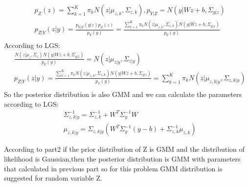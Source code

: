 \documentclass[12pt]{article}
\begin{document}
\begin{qsolve}[Question 2]
	\begin{align*}
		 & p_Z(z)=\sum_{k=1}^{K}\pi_kN(z|\mu_{z,k},\Sigma_{z,k}) ,p_{Y|Z}=N(y|Wz+b,\Sigma_{y|z})                                              \\
		 & p_{Z|Y}(z|y)=\frac{p_{Y|Z}(y|z)p_Z(z)}{p_Y(y)}=\frac{\sum_{k=1}^{K}\pi_kN(z|\mu_{z,k},\Sigma_{z,k})N(y|Wz+b,\Sigma_{y|z})}{p_Y(y)} \\
	\end{align*}
	According to LGS:
	\begin{align*}
		 & \frac{N(z|\mu_z,\Sigma_z)N(y|Wz+b,\Sigma_{y|z})}{p_Y(y)}=N(z|\mu_{z|y},\Sigma_{z|y})                                                                \\
		 & p_{Z|Y}(z|y)=\frac{\sum_{k=1}^{K}\pi_kN(z|\mu_{z,k},\Sigma_{z,k})N(y|Wz+b,\Sigma_{y|z})}{p_Y(y)}=\sum_{k=1}^{K}\pi_kN(z|\mu_{z,k|y},\Sigma_{z,k|y}) \\
	\end{align*}
	So the posterior distribution is also GMM and we can calculate the parameters according to LGS:
	\begin{align*}
		 & \Sigma_{z,k|y}^{-1}=\Sigma_{z,k}^{-1}+W^T\Sigma_y^{-1}W                      \\
		 & \mu_{z,k|y}=\Sigma_{z,k|y}(W^T\Sigma_y^{-1}(y-b)+\Sigma_{z,k}^{-1}\mu_{z,k})
	\end{align*}
\end{qsolve}


\begin{qsolve}[Question 3]
	According to part2 if the prior distribution of Z is GMM and the distribution of likelihood is Gaussian,then the posterior distribution is GMM with parameters that calculated in previous part so for this problem GMM distribution is suggested for random variable Z.
\end{qsolve}

\makeendpage
\end{document}
